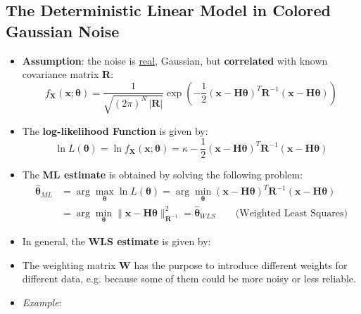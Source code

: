 \subsection{The Deterministic Linear Model in Colored Gaussian Noise}
\begin{itemize}
    \item \textbf{Assumption}: the noise is \underline{real}, Gaussian, but \textbf{correlated} with known covariance matrix \textbf{R}:
\[
f_{\mathbf{X}}(\mathbf{x};\boldsymbol{\theta})
= \frac{1}{\sqrt{(2\pi)^{N}\,|\mathbf{R}|}}
   \exp\!\left(
   -\frac{1}{2}
   (\mathbf{x}-\mathbf{H}\boldsymbol{\theta})^{T}
   \mathbf{R}^{-1}
   (\mathbf{x}-\mathbf{H}\boldsymbol{\theta})
   \right)
\]

    \item The \textbf{log-likelihood Function} is given by:
\[
\ln L(\boldsymbol{\theta})
= \ln f_{\mathbf{X}}(\mathbf{x};\boldsymbol{\theta})
= \kappa
 - \frac{1}{2}
   (\mathbf{x}-\mathbf{H}\boldsymbol{\theta})^{T}
   \mathbf{R}^{-1}
   (\mathbf{x}-\mathbf{H}\boldsymbol{\theta})
\]

    \item The \textbf{ML estimate} is obtained by solving the following problem:
\begin{align*}
\hat{\boldsymbol{\theta}}_{ML}
&= \arg\max_{\boldsymbol{\theta}} \ln L(\boldsymbol{\theta})
= \arg\min_{\boldsymbol{\theta}}
(\mathbf{x}-\mathbf{H}\boldsymbol{\theta})^{T}
\mathbf{R}^{-1}
(\mathbf{x}-\mathbf{H}\boldsymbol{\theta})\\[4pt]
&= \arg\min_{\boldsymbol{\theta}}
\big\|\mathbf{x}-\mathbf{H}\boldsymbol{\theta}\big\|^{2}_{\mathbf{R}^{-1}}
= \hat{\boldsymbol{\theta}}_{WLS}
\qquad \text{(Weighted Least Squares)}
\end{align*}

    \item In general, the \textbf{WLS estimate} is given by:
    
    
    \item The weighting matrix \textbf{W} has the purpose to introduce different weights for different data, e.g. because some of them could be more noisy or less reliable.
    \item  \textit{Example}:


\end{itemize}
